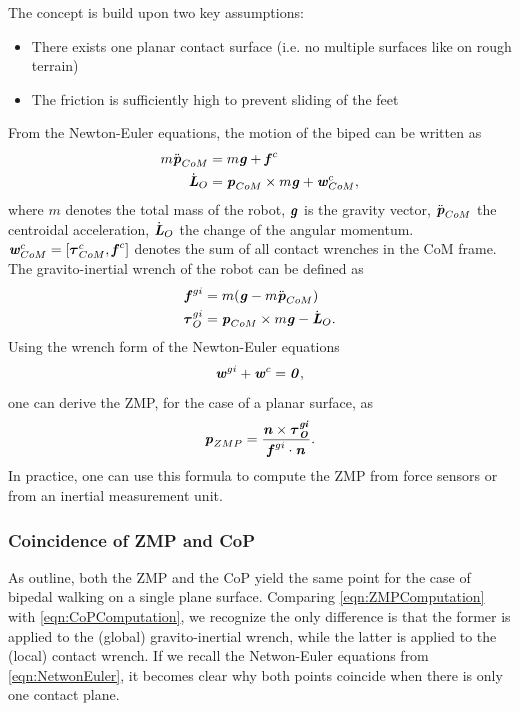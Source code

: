 The concept is build upon two key assumptions:
\begin{itemize}
\item There exists one planar contact surface (i.e. no multiple surfaces like on rough terrain)
\item The friction is sufficiently high to prevent sliding of the feet
\end{itemize}
From the Newton-Euler equations, the motion of the biped can be written as
\begin{align*}
m\ddot{\bm{\mathit{p}}}_{CoM} &= m\bm{\mathit{g}}+\bm{\mathit{f}}^c \\
\dot{\bm{\mathit{L}}}_O &= \bm{\mathit{p}}_{CoM}\times m\bm{\mathit{g}}+\bm{\mathit{w}}_{CoM}^c,
\end{align*}
where $m$ denotes the total mass of the robot, $\bm{\mathit{g}}$ is the gravity vector, $\ddot{\bm{\mathit{p}}}_{CoM}$ the centroidal acceleration, $\dot{\bm{\mathit{L}}}_O$ the change of the angular momentum. $\bm{\mathit{w}}_{CoM}^c=[\bm{\mathit{\tau}}_{CoM}^c, \bm{\mathit{f}}^c]$ denotes the sum of all contact wrenches in the \gls{CoM} frame. The gravito-inertial wrench of the robot can be defined as
\begin{align*}
\bm{\mathit{f}}^{gi} &= m(\bm{\mathit{g}}-m\ddot{\bm{\mathit{p}}}_{CoM}) \\
\bm{\mathit{\tau}}_O^{gi} &= \bm{\mathit{p}}_{CoM}\times m\bm{\mathit{g}}-\dot{\bm{\mathit{L}}}_O.
\end{align*}
Using the wrench form of the Newton-Euler equations
\begin{equation}\label{eqn:NetwonEuler} 
\bm{\mathit{w}}^{gi}+\bm{\mathit{w}}^c=\bm{\mathit{0}},
\end{equation}
one can derive the \gls{ZMP}, for the case of a planar surface, as
\begin{equation}\label{eqn:ZMPComputation}
\bm{\mathit{p}}_{ZMP}=\dfrac{\bm{\mathit{n}}\times\bm{\mathit{\bm{\mathit{\tau}}_O^{gi}}}}{\bm{\mathit{f}}^{gi}\cdot\bm{\mathit{n}}}.
\end{equation}
In practice, one can use this formula to compute the \gls{ZMP} from force sensors or from an inertial measurement unit. 
\subsubsection{Coincidence of ZMP and CoP}
As \citeauthor{sardain2004forces} outline, both the \gls{ZMP} and the \gls{CoP} yield the same point for the case of bipedal walking on a single plane surface. 
Comparing \cref{eqn:ZMPComputation} with \cref{eqn:CoPComputation}, we recognize the only difference is that the former is applied to the (global) gravito-inertial wrench, while the latter is applied to the (local) contact wrench. If we recall the Netwon-Euler equations from \cref{eqn:NetwonEuler}, it becomes clear why both points coincide when there is only one contact plane.

